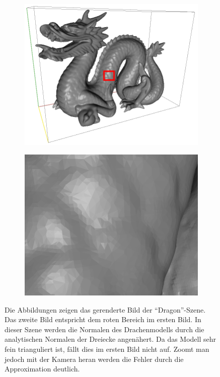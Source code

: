 		\begin{figure}
			\begin{subfigure}[b]{0.5\textwidth}
				\center
				\includegraphics[scale=0.2]{pic/normal_facette-mark.png}
				\caption{}
			\end{subfigure}
			\begin{subfigure}[b]{0.5\textwidth}
				\center
				\includegraphics[scale=0.2]{pic/normal_facette-zoom.png}
				\caption{}
			\end{subfigure}
			\caption{Die Abbildungen zeigen das gerenderte Bild der \enquote{Dragon}-Szene. Das zweite Bild entspricht dem roten Bereich im ersten Bild. In dieser Szene werden die Normalen des Drachenmodells durch die analytischen Normalen der Dreiecke angenähert. Da das Modell sehr fein trianguliert ist, fällt dies im ersten Bild nicht auf. Zoomt man jedoch mit der Kamera heran werden die Fehler durch die Approximation deutlich.}
			\label{fig:facette}
		\end{figure}

